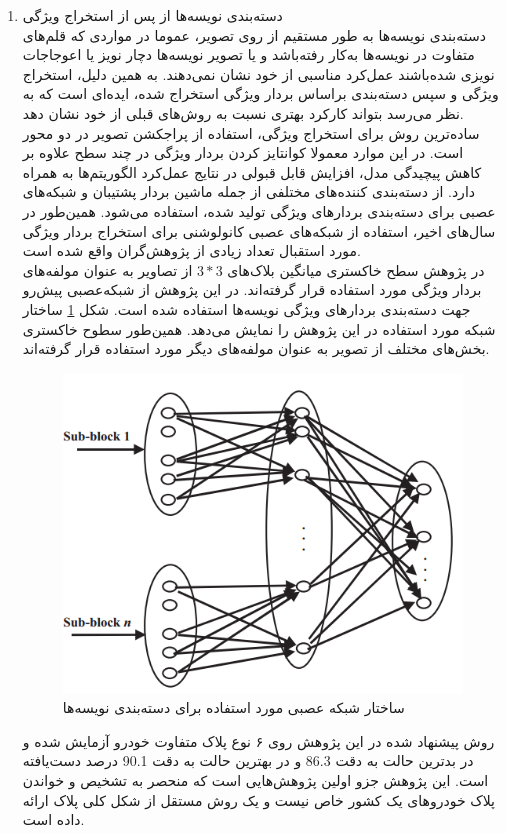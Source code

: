 \documentclass[12pt,a4paper]{article}
\begin{document}
\begin{enumerate}
\item دسته‌بندی نویسه‌ها از پس از استخراج ویژگی \\
دسته‌بندی نویسه‌ها به طور مستقیم از روی تصویر، عموما در مواردی که قلم‌های متفاوت در نویسه‌ها به‌کار رفته‌باشد و یا تصویر نویسه‌ها دچار نویز یا اعوجاجات نویزی شده‌باشند عمل‌کرد مناسبی از خود نشان نمی‌دهند. به همین دلیل، استخراج ویژگی و سپس دسته‌بندی براساس بردار ویژگی استخراج شده، ایده‌ای است که به نظر می‌رسد بتواند کارکرد بهتری نسبت به روش‌های قبلی از خود نشان دهد. 
\\
ساده‌ترین روش برای استخراج ویژگی، استفاده از پراجکشن تصویر در دو محور است. در این موارد معمولا کوانتایز کردن بردار ویژگی در چند سطح علاوه بر کاهش پیچیدگی مدل، افزایش قابل قبولی در نتایج عمل‌کرد الگوریتم‌ها به همراه دارد. از دسته‌بندی کننده‌های مختلفی از جمله ماشین بردار پشتیبان و شبکه‌های عصبی برای دسته‌بندی بردارهای ویژگی تولید شده، استفاده می‌شود. همین‌طور در سال‌های اخیر، استفاده از شبکه‌های عصبی کانولوشنی برای استخراج بردار ویژگی مورد استقبال تعداد زیادی از پژوهش‌گران واقع شده است.
\\
در پژوهش \cite{jiao2009configurable} سطح خاکستری میانگین بلاک‌های $3 * 3$ از تصاویر به عنوان مولفه‌های بردار ویژگی مورد استفاده قرار گرفته‌اند. در این پژوهش از شبکه‌عصبی پیش‌رو جهت دسته‌بندی بردارهای ویژگی نویسه‌ها استفاده شده است. شکل \ref{fig:ann2} ساختار شبکه مورد استفاده در این پژوهش را نمایش می‌دهد. همین‌طور سطوح خاکستری بخش‌های مختلف از تصویر به عنوان مولفه‌های دیگر مورد استفاده قرار گرفته‌اند. 



\begin{figure}[h]
\centering
\includegraphics[scale=0.4]{Imgs/ann2.png}
\caption{ساختار شبکه عصبی مورد استفاده برای دسته‌بندی نویسه‌ها \cite{jiao2009configurable}}
\label{fig:ann2}
\end{figure}



روش پیشنهاد شده در این پژوهش روی ۶ نوع پلاک متفاوت خودرو آزمایش شده و در بدترین حالت به دقت 86.3 و در بهترین حالت به دقت 90.1 درصد دست‌یافته است. این پژوهش جزو اولین پژوهش‌هایی است که منحصر به تشخیص و خواندن پلاک خودروهای یک کشور خاص نیست و یک روش مستقل از شکل کلی پلاک ارائه داده است.



\end{enumerate}
\end{document}
